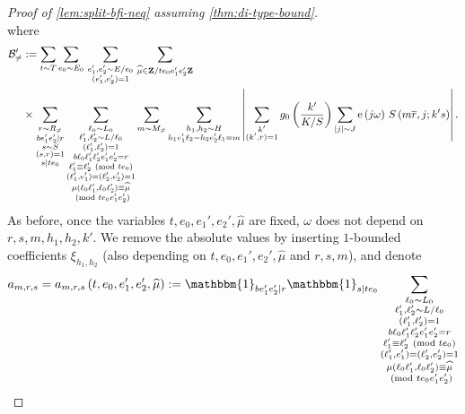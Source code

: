 \documentclass[reqno,11pt]{amsart}
\theoremstyle{definition}
\theoremstyle{remark}
\numberwithin{equation}{section}
\newcommand{\Z}{\mathbf{Z}}
\newcommand{\mB}{\mathcal{B}}
\newcommand{\e}{\textnormal{e}}
\newcommand{\one}{\mathbbm{1}}
\renewcommand{\bar}{\overline}
\renewcommand{\hat}{\widehat}
\renewcommand{\pmod}[1]{\ (\textnormal{mod } #1)}
\begin{document}
\begin{proof}[Proof of \cref{lem:split-bfi-neq} assuming \cref{thm:di-type-bound}]
\begin{equation}
\end{equation}
where
\[
\begin{aligned}
    \mB_{\neq}' 
    &:=
    \sum_{t \sim T} \sum_{e_0 \sim E_0}\,
    \sum_{\substack{e_1', e_2' \sim E/e_0 \\ (e_1', e_2') = 1}}\,
    \sum_{\hat{\mu} \in \Z/te_0e_1'e_2'\Z}
    \\
    &\times 
    \sum_{\substack{r \sim R_{\neq} \\ be_1'e_2' \mid r \\ s \sim S \\ (s, r) = 1 \\ s \mid te_0}}
    \sum_{\substack{\ell_0 \sim L_0 \\ \ell_1', \ell_2' \sim L/\ell_0 \\ (\ell_1', \ell_2') = 1 \\ b\ell_0 \ell_1' \ell_2' e_1' e_2' = r \\ \ell_1' \equiv \ell_2' \pmod{te_0} \\ (\ell_1', e_1') = (\ell_2', e_2') = 1 \\ \mu(\ell_0\ell_1', \ell_0\ell_2') \equiv \hat{\mu} \\ \pmod{te_0e_1'e_2'}}} 
    \sum_{m \sim M_{\neq}}
    \sum_{\substack{h_1, h_2 \sim H \\ h_1e_1'\ell_2 - h_2e_2'\ell_1 = m}}
    \left\vert 
    \sum_{\substack{k' \\ (k', r) = 1}} g_0 \left(\frac{k'}{K/S}\right)
    \sum_{|j| \sim J} \e\left(j \omega\right)\, 
    S\left(m \bar{r}, j; k's\right)
    \right\vert.
\end{aligned}
\]
As before, once the variables $t, e_0, e_1', e_2', \hat{\mu}$ are fixed, $\omega$ does not depend on $r, s, m, h_1, h_2, k'$.
We remove the absolute values by inserting $1$-bounded coefficients $\xi_{h_1,h_2}$ (also depending on $t, e_0, e_1', e_2', \hat{\mu}$ and $r, s, m$), and denote
\[
    a_{m,r,s} = a_{m,r,s}\left(t, e_0, e_1', e_2', \hat{\mu}\right) := 
    \one_{b e_1'e_2' \mid r}
    \one_{s \mid te_0}
    \sum_{\substack{\ell_0 \sim L_0 \\ \ell_1', \ell_2' \sim L/\ell_0 \\ (\ell_1', \ell_2') = 1 \\ b\ell_0 \ell_1' \ell_2' e_1' e_2' = r \\ \ell_1' \equiv \ell_2' \pmod{te_0} \\ (\ell_1', e_1') = (\ell_2', e_2') = 1 \\ \mu(\ell_0\ell_1', \ell_0\ell_2') \equiv \hat{\mu} \\ \pmod{te_0e_1'e_2'}}}
\]
\end{proof}
\end{document}
